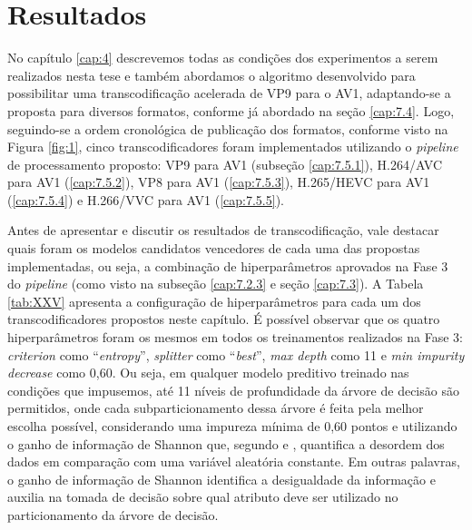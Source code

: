 \section{Resultados}
\label{cap:7.5}

No capítulo \ref{cap:4} descrevemos todas as condições dos experimentos a serem realizados nesta tese e também abordamos o algoritmo desenvolvido para possibilitar uma transcodificação acelerada de VP9 para o AV1, adaptando-se a proposta para diversos formatos, conforme já abordado na seção \ref{cap:7.4}. Logo, seguindo-se a ordem cronológica de publicação dos formatos, conforme visto na Figura \ref{fig:1}, cinco transcodificadores foram implementados utilizando o \textit{pipeline} de processamento proposto: VP9 para AV1 (subseção \ref{cap:7.5.1}), H.264/AVC para AV1 (\ref{cap:7.5.2}), VP8 para AV1 (\ref{cap:7.5.3}), H.265/HEVC para AV1 (\ref{cap:7.5.4}) e H.266/VVC para AV1 (\ref{cap:7.5.5}). 

Antes de apresentar e discutir os resultados de transcodificação, vale destacar quais foram os modelos candidatos vencedores de cada uma das propostas implementadas, ou seja, a combinação de hiperparâmetros aprovados na Fase 3 do \textit{pipeline} (como visto na subseção \ref{cap:7.2.3} e seção \ref{cap:7.3}). A Tabela \ref{tab:XXV} apresenta a configuração de hiperparâmetros para cada um dos transcodificadores propostos neste capítulo. É possível observar que os quatro hiperparâmetros foram os mesmos em todos os treinamentos realizados na Fase 3: \textit{criterion} como ``\textit{entropy}'', \textit{splitter} como ``\textit{best}'', \textit{max depth} como 11 e \textit{min impurity decrease} como 0,60. Ou seja, em qualquer modelo preditivo treinado nas condições que impusemos, até 11 níveis de profundidade da árvore de decisão são permitidos, onde cada subparticionamento dessa árvore é feita pela melhor escolha possível, considerando uma impureza mínima de 0,60 pontos e utilizando o ganho de informação de Shannon que, segundo \citet{bib:CART_matematica} e \citet{bib:shannon_entropy}, quantifica a desordem dos dados em comparação com uma variável aleatória constante. Em outras palavras, o ganho de informação de Shannon identifica a desigualdade da informação e auxilia na tomada de decisão sobre qual atributo deve ser utilizado no particionamento da árvore de decisão. 



